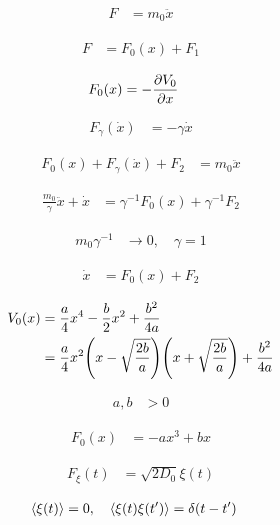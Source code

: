 \documentclass[a4paper,10pt]{article}
\begin{document}
\begin{align}
	F
	&=
	m_0\ddot{x}
\end{align}

\begin{align}
	F
	&=
	F_0(x)
	+
	F_1
\end{align}

\begin{align}
	F_0(x)
	&=
	-\pdv{V_0}{x}
\end{align}

\begin{align}
	F_\gamma
	(\dot{x})
	&=
	-\gamma
	\dot{x}
\end{align}

\begin{align}
	F_0(x)
	+
	F_\gamma
	(\dot{x})
	+
	F_2
	&=
	m_0
	\ddot{x}
\end{align}

\begin{align}
	\frac{m_0}{\gamma}
	\ddot{x}
	+
	\dot{x}
	&=
	\gamma^{-1}
	F_0(x)
	+
	\gamma^{-1}
	F_2
\end{align}

\begin{align}
	m_0\gamma^{-1}
	&\to
	0
	,\quad
	\gamma
	=
	1
\end{align}


\begin{align}
	\dot{x}
	&=
	F_0(x)
	+
	F_2
\end{align}


\begin{align}
	V_0
	(x)
	&=
	\frac{a}{4}
	x^4
	-
	\frac{b}{2}
	x^2
	+
	\frac{b^2}{4a}
\\
	&=
	\frac{a}{4}
	x^2
	\pqty{
		x-\sqrt{\frac{2b}{a}}
	}
	\pqty{
		x+\sqrt{\frac{2b}{a}}	
	}
	+
	\frac{b^2}{4a}
\end{align}

\begin{align}
	a,b&>0
\end{align}

\begin{align}
	F_0(x)
	&=
	-ax^3
	+bx
\end{align}

\begin{align}
	F_\xi(t)
	&=
	\sqrt{2D_0}
	\xi(t)
\end{align}

\begin{align}
	\expval{\xi(t)}
	&=
	0,
	\quad
	\expval{\xi(t)\xi(t^\prime)}
	=
	\delta(t-t^\prime)
\end{align}
\end{document}
